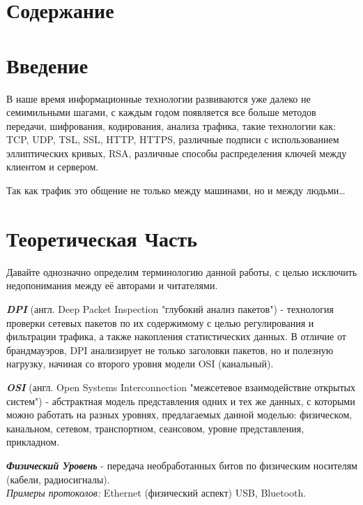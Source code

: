 \documentclass[utf8,14pt,a4paper,oneside,russian]{book}
\makeatletter
\renewcommand{\tableofcontents}{\section{Содержание}\markboth{Содержание}{}\@starttoc{toc}\newpage}
\makeatother
\begin{document}
\tableofcontents


\newpage
\section{Введение}

В наше время информационные технологии развиваются уже далеко не семимильными шагами, с каждым годом
появляется все больше методов передачи, шифрования, кодирования, анализа трафика, такие технологии как:
TCP, UDP, TSL, SSL, HTTP, HTTPS, различные подписи с использованием эллиптических кривых, RSA, различные
способы распределения ключей между клиентом и сервером.

Так как трафик это общение не только между машинами, но и между людьми\dots

\lipsum[1]


\newpage
\section{Теоретическая Часть}

Давайте однозначно определим терминологию данной работы, с целью исключить недопонимания между
её авторами и читателями.

\textbf{\textit{DPI}} (англ. Deep Packet Inspection "глубокий анализ пакетов") - технология проверки сетевых пакетов по их содержимому
с целью регулирования и фильтрации трафика, а также накопления статистических данных. В отличие от брандмауэров, DPI
анализирует не только заголовки пакетов, но и полезную нагрузку, начиная со второго уровня модели OSI (канальный).

\textbf{\textit{OSI}} (англ. Open Systems Interconnection "межсетевое взаимодействие открытых систем") - абстрактная модель представления
одних и тех же данных, с которыми можно работать на разных уровнях, предлагаемых данной моделью: физическом, канальном,
сетевом, транспортном, сеансовом, уровне представления, прикладном.

\textbf{\textit{Физический Уровень}} - передача необработанных битов по физическим носителям (кабели, радиосигналы).\\
\textit{Примеры протоколов:} Ethernet (физический аспект) USB, Bluetooth.
\end{document}

